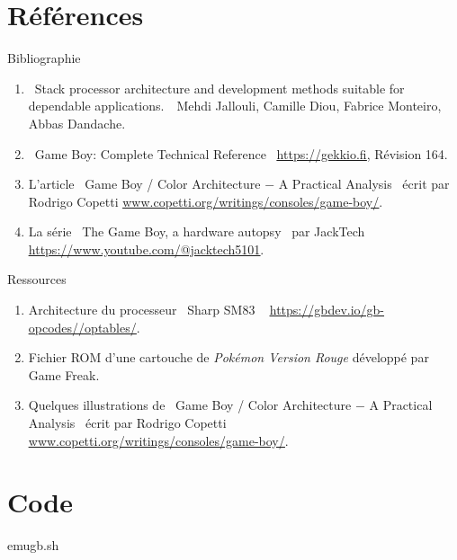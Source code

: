 \documentclass{beamer}
\begin{document}
    \appendix
    \section{Références}
    \begin{frame}{Bibliographie}
        \begin{enumerate}
            \item \guillemotleft\ Stack processor architecture and development methods suitable for dependable
applications.\ \guillemotright\ Mehdi Jallouli, Camille Diou, Fabrice Monteiro, Abbas Dandache.
            \item \guillemotleft\ Game Boy: Complete Technical Reference \guillemotright\ {\color{blue}\underline{\url{https://gekkio.fi}}}, Révision 164.
            \item L'article \guillemotleft\ Game Boy / Color Architecture $-$ A Practical Analysis \guillemotright\ écrit par Rodrigo Copetti {\color{blue} \underline{\href{https://www.copetti.org/writings/consoles/game-boy/}{www.copetti.org/writings/consoles/game-boy/}}}.
            \item La série \guillemotleft\ The Game Boy, a hardware autopsy \guillemotright\ par JackTech {\color{blue} \underline{\url{https://www.youtube.com/@jacktech5101}}}.
        \end{enumerate}
    \end{frame}

    \begin{frame}{Ressources}
        \begin{enumerate}
            \item Architecture du processeur \guillemotleft\ Sharp SM83 \guillemotright\ {\color{blue} \underline{\url{https://gbdev.io/gb-opcodes//optables/}}}.
            \item Fichier ROM d'une cartouche de \textit{Pokémon Version Rouge} développé par Game Freak.
            \item Quelques illustrations de \guillemotleft\ Game Boy / Color Architecture $-$ A Practical Analysis \guillemotright\ écrit par Rodrigo Copetti {\color{blue} \underline{\href{https://www.copetti.org/writings/consoles/game-boy/}{www.copetti.org/writings/consoles/game-boy/}}}.
        \end{enumerate}
    \end{frame}

    \section{Code}
    \begin{frame}{emugb.sh}
        \lstset{language=bash}
        
    \end{frame}
\end{document}
